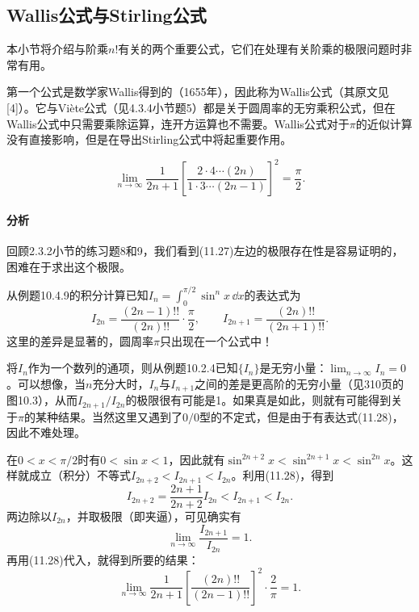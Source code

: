 \subsection{Wallis公式与Stirling公式}

本小节将介绍与阶乘$n!$有关的两个重要公式，它们在处理有关阶乘的极限问题时非常有用。

第一个公式是数学家Wallis得到的（1655年），因此称为Wallis公式（其原文见[4]）。它与Viète公式（见4.3.4小节题5）都是关于圆周率的无穷乘积公式，但在Wallis公式中只需要乘除运算，连开方运算也不需要。Wallis公式对于$\pi$的近似计算没有直接影响，但是在导出Stirling公式中将起重要作用。

\begin{xproposition}[11.4.1（Wallis公式）]
\begin{equation}
  \lim_{n\to\infty}\frac1{2n+1}
  \left[\frac{2\cdot4\cdots(2n)}{1\cdot3\cdots(2n-1)}\right]^2
  =\frac\pi2.
  \tag{11.27}
  \label{eq:11.27}
\end{equation}
\end{xproposition}

\paragraph{分析} 回顾2.3.2小节的练习题8和9，我们看到(11.27)左边的极限存在性是容易证明的，困难在于求出这个极限。

从例题10.4.9的积分计算已知$I_n=\int_0^{\pi/2}\sin^nx\,\dd x$的表达式为
\begin{equation}
  I_{2n}=\frac{(2n-1)!!}{(2n)!!}\cdot\frac\pi2,
  \qquad
  I_{2n+1}=\frac{(2n)!!}{(2n+1)!!}.
  \tag{11.28}
  \label{eq:11.28}
\end{equation}
这里的差异是显著的，圆周率$\pi$只出现在一个公式中！

将$I_n$作为一个数列的通项，则从例题10.2.4已知$\{I_n\}$是无穷小量：$\lim_{n\to\infty}I_n=0$。可以想像，当$n$充分大时，$I_n$与$I_{n+1}$之间的差是更高阶的无穷小量（见310页的图10.3），从而$I_{2n+1}/I_{2n}$的极限很有可能是1。如果真是如此，则就有可能得到关于$\pi$的某种结果。当然这里又遇到了$0/0$型的不定式，但是由于有表达式(11.28)，因此不难处理。

\begin{xproof}
在$0<x<\pi/2$时有$0<\sin x<1$，因此就有$\sin^{2n+2}x<\sin^{2n+1}x<\sin^{2n}x$。这样就成立（积分）不等式$I_{2n+2}<I_{2n+1}<I_{2n}$。利用(11.28)，得到
\[
  I_{2n+2}=\frac{2n+1}{2n+2}I_{2n}<I_{2n+1}<I_{2n}.
\]
两边除以$I_{2n}$，并取极限（即夹逼），可见确实有
\[
  \lim_{n\to\infty}\frac{I_{2n+1}}{I_{2n}}=1.
\]
再用(11.28)代入，就得到所要的结果：
\[
  \lim_{n\to\infty}\frac1{2n+1}
  \left[\frac{(2n)!!}{(2n-1)!!}\right]^2\cdot\frac2\pi=1.
\]
\end{xproof}

